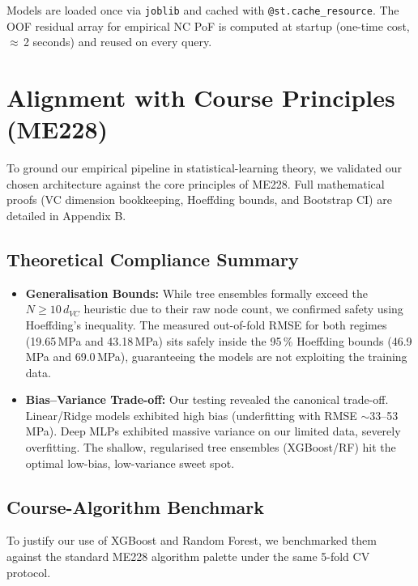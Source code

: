 \documentclass[12pt,a4paper]{article}
\begin{document}
Models are loaded once via \texttt{joblib} and cached with \texttt{@st.cache\_resource}.
The OOF residual array for empirical NC PoF is computed at startup (one-time cost,
$\approx$\,2 seconds) and reused on every query.


\section{Alignment with Course Principles (ME228)}\label{sec:theory}

To ground our empirical pipeline in statistical-learning theory, we validated our chosen architecture against the core principles of ME228. Full mathematical proofs (VC dimension bookkeeping, Hoeffding bounds, and Bootstrap CI) are detailed in Appendix B. 

\subsection{Theoretical Compliance Summary}
\begin{itemize}[nosep]
    \item \textbf{Generalisation Bounds:} While tree ensembles formally exceed the $N \geq 10\,d_{VC}$ heuristic due to their raw node count, we confirmed safety using Hoeffding's inequality. The measured out-of-fold RMSE for both regimes (19.65\,MPa and 43.18\,MPa) sits safely inside the 95\,\% Hoeffding bounds (46.9\,MPa and 69.0\,MPa), guaranteeing the models are not exploiting the training data.
    \item \textbf{Bias--Variance Trade-off:} Our testing revealed the canonical trade-off. Linear/Ridge models exhibited high bias (underfitting with RMSE $\sim$33--53\,MPa). Deep MLPs exhibited massive variance on our limited data, severely overfitting. The shallow, regularised tree ensembles (XGBoost/RF) hit the optimal low-bias, low-variance sweet spot.
\end{itemize}

\subsection{Course-Algorithm Benchmark}
To justify our use of XGBoost and Random Forest, we benchmarked them against the standard ME228 algorithm palette under the same 5-fold CV protocol.
\end{document}
